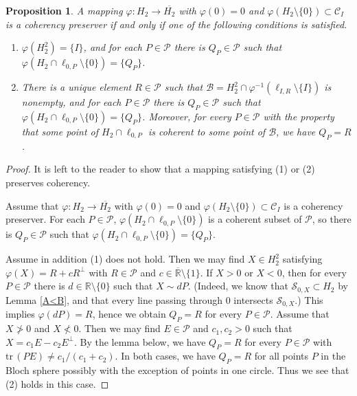 \documentclass[10pt]{amsart}
\newtheorem{proposition}[theorem]{Proposition}
\theoremstyle{definition}
\theoremstyle{remark}
\numberwithin{subsection}{section}
\numberwithin{equation}{section}
\newcommand\cP{{\mathcal{P}}}
\newcommand\oH{{\overline{H_2}}}
\newcommand\oR{{\overline{\mathbb{R}}}}
\begin{document}
\begin{proposition}\label{jebjo}
A mapping $\varphi\colon H_2\to \oH$ with $\varphi(0)=0$ and $\varphi(H_2\setminus \{0\})\subset\mathcal{C}_I$ is a coherency preserver if and only if one of the following conditions is satisfied. 
\begin{enumerate}
\item $\varphi(H_2^2)= \{I\}$, and for each $P\in \mathcal{P}$ there is $Q_P \in \cP$ such that $\varphi(H_2\cap\ell_{0, P}\setminus\{0\})= \{Q_P \}$.
\item There is a unique element $R\in \cP$ such that $\mathcal{B}= H_2^2\cap \varphi^{-1}(\ell_{I, R}\setminus\{I\})$ is nonempty, and for each $P\in \mathcal{P}$ there is $Q_P\in \cP$ such that $\varphi(H_2\cap \ell_{0, P}\setminus\{0\})= \{Q_P\}$. Moreover, for every $P\in \cP$ with the property that some point of $H_2\cap \ell_{0, P}$ is coherent to some point of $\mathcal{B}$, we have $Q_P=R$. 
\end{enumerate}
\end{proposition}
\begin{proof}
It is left to the reader to show that a mapping satisfying (1) or (2) preserves coherency. 

Assume that $\varphi\colon H_2\to \oH$ with $\varphi(0)=0$ and $\varphi(H_2\setminus \{0\})\subset\mathcal{C}_I$ is a coherency preserver. 
For each $P\in \mathcal{P}$,  $\varphi(H_2\cap\ell_{0, P}\setminus\{0\})$ is a coherent subset of $\cP$, so there is $Q_P\in \cP$ such that $\varphi(H_2\cap\ell_{0, P}\setminus\{0\})= \{Q_P\}$.

Assume in addition (1) does not hold. 
Then we may find $X\in H_2^2$ satisfying $\varphi(X)=R + cR^\perp$ with $R\in \cP$ and $c\in {\oR}\setminus\{1\}$. 
If $X>0$ or $X<0$, then for every $P\in \cP$ there is $d\in\mathbb{R}\setminus\{0\}$ such that $X\sim dP$. 
(Indeed, we know that $\mathcal{S}_{0,X}\subset H_2$ by Lemma \ref{A<B}, and that every line passing through $0$ intersects $\mathcal{S}_{0,X}$.)
This implies $\varphi(dP)=R$, hence we obtain $Q_P=R$ for every $P\in \cP$. 
Assume that $X\not>0$ and $X\not<0$. 
Then we may find $E\in \cP$ and $c_1, c_2>0$ such that $X=c_1E-c_2E^\perp$. 
By the lemma below, we have $Q_P=R$ for every $P\in \cP$ with $\mathrm{tr}\, (PE)\neq c_1/(c_1+c_2)$. 
In both cases, we have $Q_P=R$ for all points $P$ in the Bloch sphere possibly with the exception of points in one circle.
Thus we see that (2) holds in this case.
\end{proof}
\end{document}
